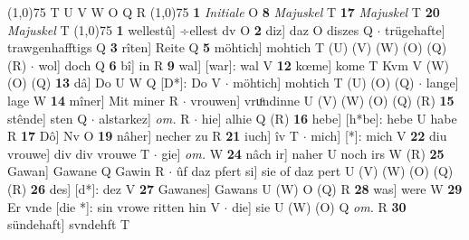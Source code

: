 \documentclass[8pt,a4paper,notitlepage]{article}
\begin{document}
\begin{table}[ht]
\begin{minipage}[t]{0.5\linewidth}
\scriptsize
\line(1,0){75} \newline
T U V W O Q R \newline
\line(1,0){75} \newline
\textbf{1} \textit{Initiale} O  \textbf{8} \textit{Majuskel} T  \textbf{17} \textit{Majuskel} T  \textbf{20} \textit{Majuskel} T  \newline
\line(1,0){75} \newline
\textbf{1} wellestû] ÷ellest dv O \textbf{2} diz] daz O diszes Q  $\cdot$ trügehafte] trawgenhafftigs Q \textbf{3} rîten] Reite Q \textbf{5} möhtich] mohtich T (U) (V) (W) (O) (Q) (R)  $\cdot$ wol] doch Q \textbf{6} bî] in R \textbf{9} wal] [war]: wal V \textbf{12} kœme] kome T Kvm V (W) (O) (Q) \textbf{13} dâ] Do U W Q [D*]: Do V  $\cdot$ möhtich] mohtich T (U) (O) (Q)  $\cdot$ lange] lage W \textbf{14} mîner] Mit miner R  $\cdot$ vrouwen] vruͦndinne U (V) (W) (O) (Q) (R) \textbf{15} stênde] sten Q  $\cdot$ alstarkez] \textit{om.} R  $\cdot$ hie] alhie Q (R) \textbf{16} hebe] [h*be]: hebe U habe R \textbf{17} Dô] Nv O \textbf{19} nâher] necher zu R \textbf{21} iuch] îv T  $\cdot$ mich] [*]: mich V \textbf{22} diu vrouwe] div div vrouwe T  $\cdot$ gie] \textit{om.} W \textbf{24} nâch ir] naher U noch irs W (R) \textbf{25} Gawan] Gawane Q Gawin R  $\cdot$ ûf daz pfert si] sie of daz pert U (V) (W) (O) (Q) (R) \textbf{26} des] [d*]: dez V \textbf{27} Gawanes] Gawans U (W) O (Q) R \textbf{28} was] were W \textbf{29} Er vnde [die *]: sin vrowe ritten hin V  $\cdot$ die] sie U (W) (O) Q \textit{om.} R \textbf{30} sündehaft] svndehft T \newline
\end{minipage}
\end{table}
\end{document}
